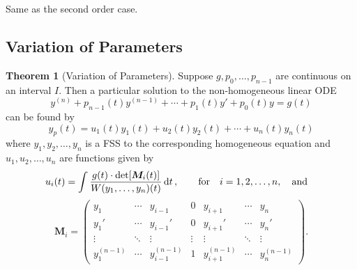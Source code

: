 \documentclass[10pt,UTF8]{article}
\newcommand{\mat}[1]{\bm{#1}}
\newenvironment{theoremBox}
{
  \begin{tcolorbox}[colback=yellow!5!white,colframe=yellow!75!black,parbox=false,before
  upper=\par,before lower=\par]}
  {
\end{tcolorbox}}
\theoremstyle{definition}
\newtheorem{definition inner}{Definition}[section]
\theoremstyle{definition}
\newtheorem{theorem inner}{Theorem}[section]
\newenvironment{theorem}[1][]
{
  \begin{theoremBox}
  \begin{theorem inner}[#1]\hfill\par}
    {
    \end{theorem inner}
\end{theoremBox}}
\theoremstyle{definition}
\newtheorem*{proof inner}{\textit{Proof}}
\theoremstyle{plain}
\newtheorem{tip inner}{Tip}[section]
\theoremstyle{remark}
\begin{document}
Same as the second order case.

\subsection{Variation of Parameters}

\begin{theorem}[Variation of Parameters]
  {}\label{thm: Variation of Parameters}
  Suppose \(g, p_0,\ldots,p_{n-1}\) are continuous on an interval \(I\).
  Then a particular solution to the non-homogeneous linear ODE
  \begin{equation*}
    y^{(n)} + p_{n-1}(t) y^{(n-1)} + \cdots + p_1(t) y' + p_0(t) y = g(t)
  \end{equation*}
  can be found by
  \begin{equation*}
    y_p(t) = u_1(t) y_1(t) + u_2(t) y_2(t) + \cdots + u_n(t) y_n(t)
  \end{equation*}
  where \(y_1, y_2, \ldots, y_n\) is a FSS to the corresponding
  homogeneous equation
  and \(u_1, u_2, \ldots, u_n\) are functions given by
  \begin{equation*}
    u_i(t) = \int \frac{g(t) \cdot \det[\mat{M}_i(t)]}{W(y_1, \ldots,
    y_n)(t)} \dd{t},
    \quad\qfor i = 1, 2, \ldots, n, \qand
  \end{equation*}
  \begin{equation*}
    \mat{M}_i =
    \begin{pmatrix}
      y_1 & \cdots & y_{i-1} & 0 & y_{i+1} & \cdots & y_n \\
      y_1' & \cdots & y_{i-1}' & 0 & y_{i+1}' & \cdots & y_n' \\
      \vdots & \ddots & \vdots & \vdots & \vdots & \ddots & \vdots \\
      y_1^{(n-1)} & \cdots & y_{i-1}^{(n-1)} & 1 &
      y_{i+1}^{(n-1)} & \cdots & y_n^{(n-1)}
    \end{pmatrix}.
  \end{equation*}
\end{theorem}
\end{document}
